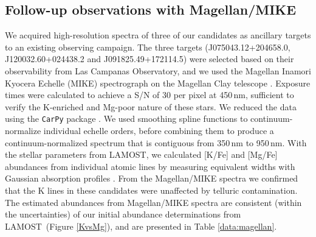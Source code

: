 \documentclass[a4paper,fleqn,usenatbib]{mnras}
\newcommand{\project}[1]{#1}
\newcommand{\lamost}{\project{LAMOST}}
\begin{document}
\subsection{Follow-up observations with Magellan/MIKE}
We acquired high-resolution spectra of three of our candidates as ancillary targets to an existing observing campaign. The three targets (J075043.12+204658.0, J120032.60+024438.2 and J091825.49+172114.5) were selected based on their observability from Las Campanas Observatory, and we used the Magellan Inamori Kyocera Echelle (MIKE) spectrograph on the Magellan Clay telescope \citep{shectman2003magellan,bernstein2003mike}. Exposure times were calculated to achieve a S/N of 30 per pixel at 450\,nm, sufficient to verify the K-enriched and Mg-poor nature of these stars. We reduced the data using the \texttt{CarPy} package \citep{kelson2003}. We used smoothing spline functions to continuum-normalize individual echelle orders, before combining them to produce a continuum-normalized spectrum that is contiguous from 350\,nm to 950\,nm. With the stellar parameters from \lamost, we calculated [K/Fe] and [Mg/Fe] abundances from individual atomic lines by measuring equivalent widths with Gaussian absorption profiles \citep{castelli2004,sneden,casey2014}. From the Magellan/MIKE spectra we confirmed that the K lines in these candidates were unaffected by telluric contamination. The estimated abundances from Magellan/MIKE spectra are consistent (within the uncertainties) of our initial abundance determinations from \lamost\ (Figure \ref{KvsMg}), and are presented in Table \ref{data:magellan}.
\end{document}
